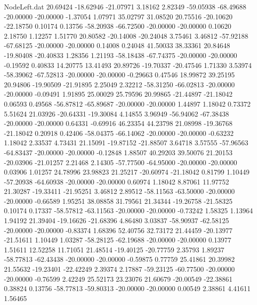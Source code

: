 \begin{filecontents}{NodeLeft.dat}
  20.69424  -18.62946  -21.07971     3.18162    2.82349  -59.05938  -68.49688  -20.00000  -20.00000   -1.37054    1.07971   35.02797   31.08520
  20.75516  -20.10620  -22.18750     0.10174    0.13756  -58.20938  -66.72500  -20.00000  -20.00000    0.10620    2.18750    1.12257    1.51770
  20.80582  -20.14008  -20.24048     3.75461    3.46812  -57.92188  -67.68125  -20.00000  -20.00000    0.14008    0.24048   41.50033   38.33361
  20.84648  -19.80408  -20.40833     1.28356    1.21193  -58.18438  -67.74375  -20.00000  -20.00000   -0.19592    0.40833   14.20775   13.41493
  20.89726  -19.70337  -20.47546     1.71330    3.53974  -58.39062  -67.52813  -20.00000  -20.00000   -0.29663    0.47546   18.99872   39.25195
  20.94806  -19.90509  -21.91895     2.25049    2.32212  -58.31250  -66.02813  -20.00000  -20.00000   -0.09491    1.91895   25.00029   25.79596
  20.99865  -21.44897  -21.18042     0.06593    0.49568  -56.87812  -65.89687  -20.00000  -20.00000    1.44897    1.18042    0.73372    5.51624
  21.03926  -20.64331  -19.30084     4.14855    3.96949  -56.94062  -67.38438  -20.00000  -20.00000    0.64331   -0.69916   46.23354   44.23798
  21.08998  -19.36768  -21.18042     0.20918    0.42406  -58.04375  -66.14062  -20.00000  -20.00000   -0.63232    1.18042    2.33537    4.73431
  21.15091  -19.87152  -21.88507     3.64718    3.57555  -57.96563  -64.83437  -20.00000  -20.00000   -0.12848    1.88507   40.29203   39.50076
  21.20153  -20.03906  -21.01257     2.21468    2.14305  -57.77500  -64.95000  -20.00000  -20.00000    0.03906    1.01257   24.78996   23.98823
  21.25217  -20.60974  -21.18042     0.81799    1.10449  -57.20938  -64.60938  -20.00000  -20.00000    0.60974    1.18042    8.87061   11.97752
  21.30287  -19.33411  -21.95251     3.46812    2.89512  -58.11563  -63.50000  -20.00000  -20.00000   -0.66589    1.95251   38.08858   31.79561
  21.34344  -19.26758  -21.58325     0.10174    0.17337  -58.57812  -63.11563  -20.00000  -20.00000   -0.73242    1.58325    1.13964    1.94192
  21.39404  -19.16626  -21.68396     4.86480    3.03837  -58.90937  -62.58125  -20.00000  -20.00000   -0.83374    1.68396   52.40756   32.73172
  21.44459  -20.13977  -21.51611     1.10449    1.03287  -58.28125  -62.19688  -20.00000  -20.00000    0.13977    1.51611   12.52258   11.71051
  21.48514  -19.40125  -20.77759     2.35793    1.89237  -58.77813  -62.43438  -20.00000  -20.00000   -0.59875    0.77759   25.41861   20.39982
  21.55632  -19.23401  -22.42249     2.39374    2.17887  -59.23125  -60.77500  -20.00000  -20.00000   -0.76599    2.42249   25.52173   23.23076
  21.60679  -20.00549  -22.38861     0.38824    0.13756  -58.77813  -59.80313  -20.00000  -20.00000    0.00549    2.38861    4.41611    1.56465

\end{filecontents}
